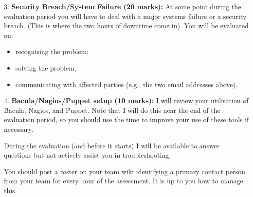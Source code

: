 \documentclass{article}   	%
\begin{document}
\vspace{0.5cm}

3.  \textbf{Security Breach/System Failure (20 marks):}  At some point during the evaluation period you will have to deal with a major systems failure or a security breach.  (This is where the two hours of downtime come in).  You will be evaluated on:

\begin{itemize}
\item recognising the problem;
\item solving the problem;
\item communicating with affected parties (e.g., the two email addresses above).
\end{itemize}

\vspace{0.5cm}

4.  \textbf{Bacula/Nagios/Puppet setup (10 marks):} I will review your utilisation of Bacula, Nagios, and Puppet.  Note that I will do this near the end of the evaluation period, so you should use the time to improve your use of these tools if necessary.

During the evaluation (and before it starts) I will be available to answer questions but not actively assist you in troubleshooting.

You should post a roster on your team wiki identifying a primary contact person from your team for every hour of the assessment. It is up to you how to manage this.
\end{document}
